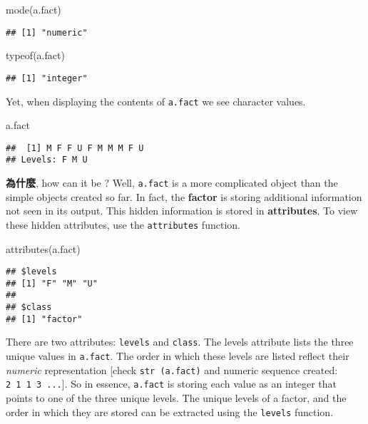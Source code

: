 \documentclass[
]{article}
\newenvironment{Shaded}{\begin{snugshade}}{\end{snugshade}}
\newcommand{\FunctionTok}[1]{\textcolor[rgb]{0.00,0.00,0.00}{#1}}
\newcommand{\NormalTok}[1]{#1}
\begin{document}
\begin{Shaded}
\begin{Highlighting}[]
\FunctionTok{mode}\NormalTok{(a.fact)}
\end{Highlighting}
\end{Shaded}

\begin{verbatim}
## [1] "numeric"
\end{verbatim}

\begin{Shaded}
\begin{Highlighting}[]
\FunctionTok{typeof}\NormalTok{(a.fact)}
\end{Highlighting}
\end{Shaded}

\begin{verbatim}
## [1] "integer"
\end{verbatim}

Yet, when displaying the contents of \texttt{a.fact} we see character
values.

\begin{Shaded}
\begin{Highlighting}[]
\NormalTok{a.fact}
\end{Highlighting}
\end{Shaded}

\begin{verbatim}
##  [1] M F F U F M M M F U
## Levels: F M U
\end{verbatim}

\textbf{為什麼}, how can it be ? Well, \texttt{a.fact} is a more
complicated object than the simple objects created so far. In fact, the
\textbf{factor} is storing additional information not seen in its
output. This hidden information is stored in \textbf{attributes}. To
view these hidden attributes, use the \texttt{attributes} function.

\begin{Shaded}
\begin{Highlighting}[]
\FunctionTok{attributes}\NormalTok{(a.fact)}
\end{Highlighting}
\end{Shaded}

\begin{verbatim}
## $levels
## [1] "F" "M" "U"
## 
## $class
## [1] "factor"
\end{verbatim}

There are two attributes: \texttt{levels} and \texttt{class}. The levels
attribute lists the three unique values in \texttt{a.fact}. The order in
which these levels are listed reflect their \emph{numeric}
representation {[}check \texttt{str\ (a.fact)} and numeric sequence
created: \texttt{2\ 1\ 1\ 3\ ...}{]}. So in essence, \texttt{a.fact} is
storing each value as an integer that points to one of the three unique
levels. The unique levels of a factor, and the order in which they are
stored can be extracted using the \texttt{levels} function.
\end{document}
